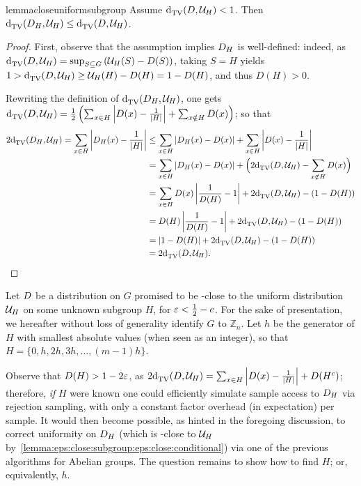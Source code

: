 \begin{restatable}{lemma}{closeuniformsubgroup}\label{lemma:eps:close:subgroup:eps:close:conditional}
Assume ${\operatorname{d}_{\textrm{TV}}^{}\!\left({D, \mathcal{U}_H}\right)} < 1$. Then ${\operatorname{d}_{\textrm{TV}}^{}\!\left({D_H, \mathcal{U}_H}\right)} \leq {\operatorname{d}_{\textrm{TV}}^{}\!\left({\ensuremath{D}, \ensuremath{\mathcal{U}}_H}\right)}$.
\end{restatable}
\begin{proof}
  First, observe that the assumption implies $D_H$ is well-defined: indeed, as 
  ${\operatorname{d}_{\textrm{TV}}^{}\!\left({D, \mathcal{U}_H}\right)} = \sup_{S\subseteq G}\left( \mathcal{U}_H(S)-D(S) \right)$, 
  taking $S=H$ yields $1 > {\operatorname{d}_{\textrm{TV}}^{}\!\left({D, \mathcal{U}_H}\right)} \geq \mathcal{U}_H(H)-D(H) = 1-D(H)$, 
  and thus $D(H) > 0$.

  Rewriting the definition of ${\operatorname{d}_{\textrm{TV}}^{}\!\left({D_H, \mathcal{U}_H}\right)}$, one gets ${\operatorname{d}_{\textrm{TV}}^{}\!\left({D, \mathcal{U}_H}\right)} = \frac{1}{2}\left( \sum_{x\in H} \left\lvert  D(x) - \frac{1}{\left\lvert H \right\rvert}  \right\rvert + \sum_{x\notin H} D(x)\right)$; so that
  \begin{align*}
    2{\operatorname{d}_{\textrm{TV}}^{}\!\left({D_H, \mathcal{U}_H}\right)} = \sum_{x\in H} \left\lvert  D_H(x) - \frac{1}{\left\lvert H \right\rvert}  \right\rvert 
    &\leq \sum_{x\in H} \left\lvert  D_H(x) - D(x)  \right\rvert  + \sum_{x\in H} \left\lvert  D(x) - \frac{1}{\left\lvert H \right\rvert}  \right\rvert \\
    &= \sum_{x\in H} \left\lvert  D_H(x) - D(x)  \right\rvert  + \Big(2{\operatorname{d}_{\textrm{TV}}^{}\!\left({D, \mathcal{U}_H}\right)} - \sum_{x\notin H} D(x)\Big) \\
    &= \sum_{x\in H} D(x)\left\lvert  \frac{1}{D(H)} - 1  \right\rvert  + 2{\operatorname{d}_{\textrm{TV}}^{}\!\left({D, \mathcal{U}_H}\right)} - \left(1-D(H)\right) \\
    &= D(H)\left\lvert  \frac{1}{D(H)} - 1  \right\rvert  + 2{\operatorname{d}_{\textrm{TV}}^{}\!\left({D, \mathcal{U}_H}\right)} - \left(1-D(H)\right) \\
    &= \left\lvert 1-D(H) \right\rvert + 2{\operatorname{d}_{\textrm{TV}}^{}\!\left({D, \mathcal{U}_H}\right)} - \left(1-D(H)\right)\\
    &= 2{\operatorname{d}_{\textrm{TV}}^{}\!\left({D, \mathcal{U}_H}\right)}.
  \end{align*}
\end{proof}

Let $D$ be a distribution on $G$ promised to be \eps-close to the uniform distribution $\mathcal{U}_H$ on some unknown subgroup $H$, for $\varepsilon < \frac{1}{2}-c$. For the sake of presentation, we hereafter without loss of generality identify $G$ to $\mathbb{Z}_n$. Let $h$ be the generator of $H$ with smallest absolute values (when seen as an integer), so that $H=\{0, h,2h,3h,\dots,(m-1)h\}$.

\noindent Observe that $D(H) > 1-2\varepsilon$, as $2{\operatorname{d}_{\textrm{TV}}^{}\!\left({D, \mathcal{U}_H}\right)} = \sum_{x\in H} \left\lvert  D(x) - \frac{1}{\left\lvert H \right\rvert}  \right\rvert + D(H^c)$; therefore, \emph{if} $H$ were known one could efficiently simulate sample access to $D_H$ via rejection sampling, with only a constant factor overhead (in expectation) per sample. It would then become possible, as hinted in the foregoing discussion, to correct uniformity on $D_H$ (which is \eps-close to $\mathcal{U}_H$ by~\autoref{lemma:eps:close:subgroup:eps:close:conditional}) via one of the previous algorithms for Abelian groups. The question remains to show how to find $H$; or, equivalently, $h$.\medskip

